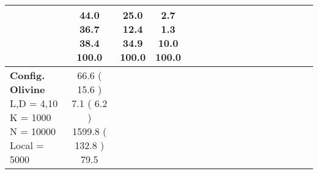 \documentclass[9pt]{article}
\begin{document}
\begin{landscape}
\begin{longtable}{ l | c c c c | c c c c | c c c c | c c c c |}
             &
                            \makecell{              44.0
     \\
            {\footnotesize             36.7
    } \\  {\footnotesize             38.4
     } \\
            {\small \textcolor[rgb]{ 0.2 , 0.7 , 0.1} {100.0  }
} }
             &                         \makecell{              25.0
     \\
            {\footnotesize             \textbf{ 12.4 }
    } \\  {\footnotesize             34.9
     } \\
            {\small \textcolor[rgb]{ 0.2 , 0.7 , 0.1} {100.0  }
} }
             &
                            \makecell{              \textbf{ 2.7 }
     \\
            {\footnotesize             1.3
    } \\  {\footnotesize             10.0
     } \\
            {\small \textcolor[rgb]{ 0.2 , 0.7 , 0.1} {100.0  }
} }
            

 \\
                                                            
                    \hline
                    \makecell{ \textbf{ Config. Olivine} \\
                    { \small L,D = 4,10} \\
                    {\small K = 1000} \\
                    {\small N = 10000 } \\ {\small Local = 5000 }} &
                    
                            \makecell{              66.6
     (             15.6
    ) \\
            {\footnotesize             7.1
     (              6.2
     )} \\
            {\footnotesize             1599.8
     (            132.8
    ) } \\
            {\small  \textcolor[rgb]{ 0.61 , 0.29 , 0.1} {79.5  }
} }



\end{longtable}
\end{landscape}
\end{document}
